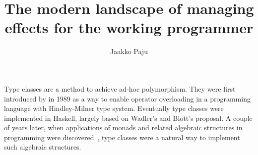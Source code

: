 \documentclass[language=english,version=draft,mainfont=none,minted=true]{utuftthesis}
\providecommand{\algorithmname}{Algoritmi}
\begin{document}
\title{The modern landscape of managing effects for the working programmer}
\author{Jaakko Paju}

\maketitle



\tableofcontents %

\listofacronyms %

\renewcommand{\algorithmname}{\listingscaption}

\newcommand{\inlinecode}[1]{\texttt{#1}}
\newcommand{\inlinescala}[1]{\texttt{#1}}
\newcommand{\inlinehaskell}[1]{\texttt{#1}}

\newcommand{\titlecite}[1]{\citetitle{#1}~\cite{#1}}








\printbibliography

\begin{comment}
Important! Create the appendix chapters with command \textbackslash appchapter\{some
name\} instead of \textbackslash chapter\{some name\} for the automagic
page counting to work!
\end{comment}



\label{typeclasses}
Type classes are a method to achieve ad-hoc polymorphism. They were first introduced by \textcite{ad-hoc-less-ad-hoc} in 1989 as a way to enable operator overloading in a programming language with Hindley-Milner type system. Eventually type classes were implemented in Haskell, largely based on Wadler's and Blott's proposal. A couple of years later, when applications of monads and related algebraic structures in programming were discovered~\cite{comp-lambda-monads}, type classes were a natural way to implement such algebraic structures.
\end{document}
